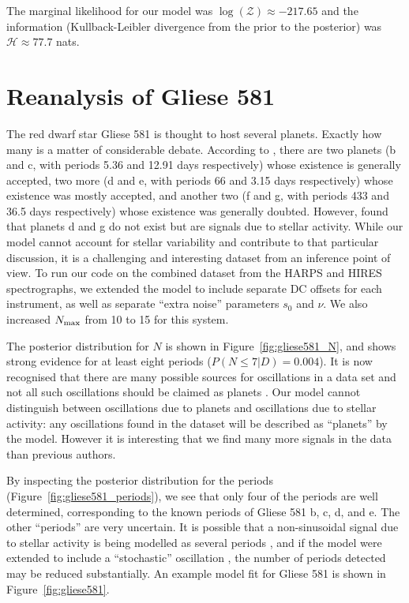\documentclass[useAMS,usenatbib]{mn2e}
\begin{document}
The marginal likelihood for our model was
$\log(\mathcal{Z}) \approx -217.65$ and the information
(Kullback-Leibler divergence from the prior to the posterior)
was $\mathcal{H} \approx 77.7$ nats.

\section{Reanalysis of Gliese 581}
The red dwarf star Gliese 581 is thought to host several planets. Exactly
how many is a matter of considerable debate. According to
\citet{2014Sci...345..440R}, there are two planets
(b and c, with periods 5.36 and 12.91 days respectively)
whose existence is generally
accepted, two more
(d and e, with periods 66 and 3.15 days respectively)
whose existence was mostly accepted, and another two
(f and g, with periods 433 and 36.5 days respectively)
whose existence was generally doubted. However, \citet{2014Sci...345..440R}
found that planets d and g do not exist but are signals due to stellar activity.
While our model cannot account for stellar variability and contribute to that
particular discussion, it is a challenging and interesting dataset from an
inference point of view.
To run our code on the combined dataset from the HARPS and HIRES spectrographs,
we extended the model to include separate DC offsets for each instrument, as
well as separate ``extra noise'' parameters $s_0$ and $\nu$. We also increased
$N_{\rm max}$ from 10 to 15 for this system.

The posterior distribution for $N$ is shown in Figure~\ref{fig:gliese581_N},
and shows strong evidence for at least eight periods
($P(N \leq 7 | D) = 0.004$).
It is now recognised that
there are many possible sources for oscillations in a data set and not all
such oscillations should be claimed as planets \citep{2014Sci...345..440R}. 
Our model cannot distinguish between oscillations due to planets and
oscillations due to stellar activity: any oscillations found in the dataset
will be described as ``planets'' by the model. However it is interesting that
we find many more signals in the data than previous authors.

By inspecting the posterior distribution for the periods
(Figure~\ref{fig:gliese581_periods}), we see that only four of the periods
are well determined, corresponding to the known periods of Gliese 581 b, c, d,
and e. The other ``periods'' are very uncertain. It is possible that a
non-sinusoidal signal due to stellar activity is being modelled as several
periods \citep{astero}, and if the model were extended to include a ``stochastic''
oscillation \citep{gaussproc}, the number of periods detected may be reduced
substantially. An example model fit for Gliese 581 is shown in
Figure~\ref{fig:gliese581}.
\end{document}
